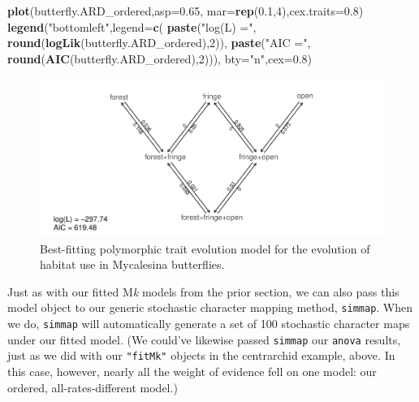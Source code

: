 \documentclass[fleqn,10pt,lineno]{wlpeerj} %
\newenvironment{Shaded}{\begin{snugshade}}{\end{snugshade}}
\newcommand{\AttributeTok}[1]{\textcolor[rgb]{0.13,0.29,0.53}{#1}}
\newcommand{\DecValTok}[1]{\textcolor[rgb]{0.00,0.00,0.81}{#1}}
\newcommand{\FloatTok}[1]{\textcolor[rgb]{0.00,0.00,0.81}{#1}}
\newcommand{\FunctionTok}[1]{\textcolor[rgb]{0.13,0.29,0.53}{\textbf{#1}}}
\newcommand{\NormalTok}[1]{#1}
\newcommand{\StringTok}[1]{\textcolor[rgb]{0.31,0.60,0.02}{#1}}
\begin{document}
\begin{Shaded}
\begin{Highlighting}[]
\FunctionTok{plot}\NormalTok{(butterfly.ARD\_ordered,}\AttributeTok{asp=}\FloatTok{0.65}\NormalTok{,}
  \AttributeTok{mar=}\FunctionTok{rep}\NormalTok{(}\FloatTok{0.1}\NormalTok{,}\DecValTok{4}\NormalTok{),}\AttributeTok{cex.traits=}\FloatTok{0.8}\NormalTok{)}
\FunctionTok{legend}\NormalTok{(}\StringTok{"bottomleft"}\NormalTok{,}\AttributeTok{legend=}\FunctionTok{c}\NormalTok{(}
  \FunctionTok{paste}\NormalTok{(}\StringTok{"log(L) ="}\NormalTok{,}
  \FunctionTok{round}\NormalTok{(}\FunctionTok{logLik}\NormalTok{(butterfly.ARD\_ordered),}\DecValTok{2}\NormalTok{)),}
  \FunctionTok{paste}\NormalTok{(}\StringTok{"AIC ="}\NormalTok{,}
  \FunctionTok{round}\NormalTok{(}\FunctionTok{AIC}\NormalTok{(butterfly.ARD\_ordered),}\DecValTok{2}\NormalTok{))),}
  \AttributeTok{bty=}\StringTok{"n"}\NormalTok{,}\AttributeTok{cex=}\FloatTok{0.8}\NormalTok{)}
\end{Highlighting}
\end{Shaded}

\begin{figure}
\includegraphics[width=1\linewidth]{Revell.phytools-v2_peerj_files/figure-latex/ordered-ard-fitpolyMk-1} \caption{Best-fitting polymorphic trait evolution model for the evolution of habitat use in Mycalesina butterflies.}\label{fig:ordered-ard-fitpolyMk}
\end{figure}

Just as with our fitted M\emph{k} models from the prior section, we can also pass this model object to our generic stochastic character mapping method, \texttt{simmap}. When we do, \texttt{simmap} will automatically generate a set of 100 stochastic character maps under our fitted model. (We could've likewise passed \texttt{simmap} our \texttt{anova} results, just as we did with our \texttt{"fitMk"} objects in the centrarchid example, above. In this case, however, nearly all the weight of evidence fell on one model: our ordered, all-rates-different model.)
\end{document}
